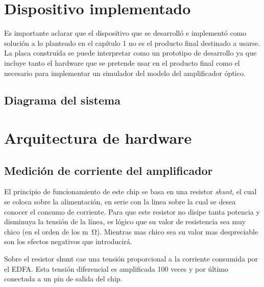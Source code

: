


\section{Dispositivo implementado}

Es importante aclarar que el dispositivo que se desarrolló e implementó como solución a lo planteado en el capítulo 1 no es el producto final destinado a usarse. La placa construída se puede interpretar como un prototipo de desarrollo ya que incluye tanto el hardware que se pretende usar en el producto final como el necesario para implementar un simulador del modelo del amplificador óptico.

\subsection{Diagrama del sistema}


\section{Arquitectura de hardware}

\subsection{Medición de corriente del amplificador}



El principio de funcionamiento de este chip se basa en una resistor \textit{shunt}, el cual se coloca sobre la alimentación, en serie con la linea sobre la cual se desea conocer el consumo de corriente. Para que este resistor no disipe tanta potencia y disminuya la tensión de la línea, es lógico que su valor de resistencia sea muy chico (en el orden de los \si{m\ohm}). Mientras mas chico sea su valor mas despreciable son los efectos negativos que introducirá.

Sobre el resistor shunt cae una tensión proporcional a la corriente consumida por el EDFA. Esta tensión diferencial es amplificada 100 veces y por último conectada a un pin de salida del chip.

